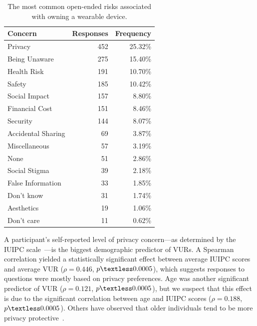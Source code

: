 \documentclass[conference]{IEEEtran}
\begin{document}
\begin{table}[t]
\begin{center}
\begin{tabular}{|l|r|r|}
\hline
Concern &  Responses &  Frequency   \\
\hline
Privacy & 452 & 25.32\% \\
Being Unaware & 275 & 15.40\% \\
Health Risk & 191 & 10.70\%\\
Safety & 185 & 10.42\%\\
Social Impact &	157 & 8.80\%\\
Financial Cost & 151 & 8.46\%\\
Security &	144 & 8.07\%\\
Accidental Sharing &	69 & 3.87\%\\
Miscellaneous &	57 & 3.19\%\\
None	& 51 & 2.86\%\\
Social Stigma &	39 & 2.18\%\\
False Information & 33 & 1.85\%\\
Don't know & 31 & 1.74\%\\
Aesthetics 	& 19 & 1.06\%\\
Don't care 	& 11 & 0.62\%\\
\hline
\end{tabular}
\caption{The most common open-ended risks associated with owning a wearable device.}
\label{openresponses}
\end{center}
\end{table}

A participant's self-reported level of privacy concern---as determined by the IUIPC scale~\cite{malhotra2004internet}---is the biggest demographic predictor of VURs. A Spearman correlation yielded a statistically significant effect between average IUIPC scores and average VUR ($\rho=0.446$, $p\textless0.0005$), which suggests responses to questions were mostly based on privacy preferences. Age was another significant predictor of VUR ($\rho=0.121$, $p\textless0.0005$), but we suspect that this effect is due to the significant correlation between age and IUIPC scores ($\rho=0.188$, $p\textless0.0005$). Others have observed that older individuals tend to be more privacy protective~\cite{varian2005demographics}.
\end{document}

